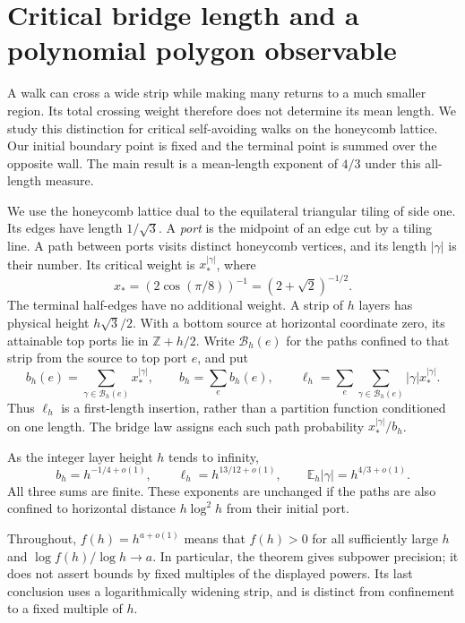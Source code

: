 \section{Critical bridge length and a polynomial polygon observable}
\label{sec:pv:introduction}

A walk can cross a wide strip while making many returns to a much smaller
region. Its total crossing weight therefore does not determine its mean
length. We study this distinction for critical self-avoiding walks on the
honeycomb lattice. Our initial boundary point is fixed and the terminal
point is summed over the opposite wall. The main result is a mean-length
exponent of $4/3$ under this all-length measure.

We use the honeycomb lattice dual to the equilateral triangular tiling of
side one. Its edges have length $1/\sqrt3$. A \emph{port} is the midpoint
of an edge cut by a tiling line. A path between ports visits distinct
honeycomb vertices, and its length $|\gamma|$ is their number. Its critical
weight is $x_*^{|\gamma|}$, where
\[
 x_*=(2\cos(\pi/8))^{-1}=(2+\sqrt2)^{-1/2}.
\]
The terminal half-edges have no additional weight. A strip of $h$ layers
has physical height $h\sqrt3/2$. With a bottom source at horizontal
coordinate zero, its attainable top ports lie in $\mathbb Z+h/2$.
Write $\mathcal B_h(e)$ for the paths confined to that strip from the
source to top port $e$, and put
\[
 b_h(e)=\sum_{\gamma\in\mathcal B_h(e)}x_*^{|\gamma|},\qquad
 b_h=\sum_e b_h(e),\qquad
 \ell_h=\sum_e\sum_{\gamma\in\mathcal B_h(e)}
 |\gamma|x_*^{|\gamma|}.
\]
Thus $\ell_h$ is a first-length insertion, rather than a partition
function conditioned on one length. The bridge law assigns each such
path probability $x_*^{|\gamma|}/b_h$.

\begin{theorem}\label{thm:pv:bridge}
As the integer layer height $h$ tends to infinity,
\[
 b_h=h^{-1/4+o(1)},\qquad
 \ell_h=h^{13/12+o(1)},\qquad
 \mathbb E_h|\gamma|=h^{4/3+o(1)}.
\]
All three sums are finite. These exponents are unchanged if the paths
are also confined to horizontal distance $h\log^2h$ from their initial
port.
\end{theorem}

Throughout, $f(h)=h^{a+o(1)}$ means that $f(h)>0$ for all sufficiently
large $h$ and $\log f(h)/\log h\to a$. In particular, the theorem gives
subpower precision; it does not assert bounds by fixed multiples of the
displayed powers. Its last conclusion uses a logarithmically widening
strip, and is distinct from confinement to a fixed multiple of $h$.

